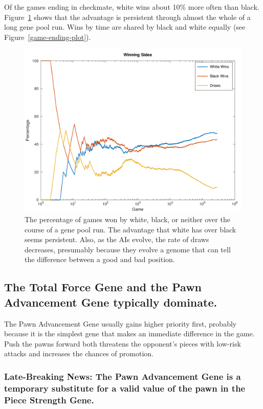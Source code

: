 \documentclass[letterpaper]{article}
\renewcommand\_{\textunderscore\allowbreak}
\begin{document}
Of the games ending in checkmate, white wins about 10\% more often than black. Figure~\ref{win-lose-plot} shows that the advantage is persistent through almost the whole of a long gene pool run. Wins by time are shared by black and white equally (see Figure~\ref{game-ending-plot}).
\begin{figure}[htb]
	\centering
	\includegraphics[width=\textwidth]{win-lose-plot}
	\caption{The percentage of games won by white, black, or neither over the course of a gene pool run. The advantage that white has over black seems persistent. Also, as the AIs evolve, the rate of draws decreases, presumably because they evolve a genome that can tell the difference between a good and bad position.}
	\label{win-lose-plot}
\end{figure}

\subsection{The Total Force Gene and the Pawn Advancement Gene typically dominate.}

The Pawn Advancement Gene usually gains higher priority first, probably because it is the simplest gene that makes an immediate difference in the game. Push the pawns forward both threatens the opponent's pieces with low-risk attacks and increases the chances of promotion.

\subsubsection{Late-Breaking News: The Pawn Advancement Gene is a temporary substitute for a valid value of the pawn in the Piece Strength Gene.}
\end{document}
